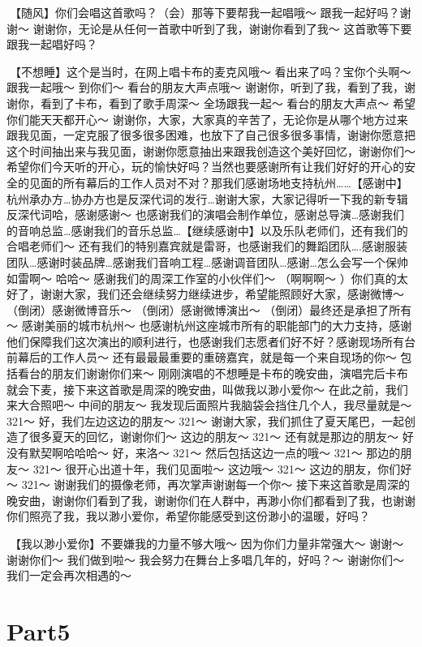 \documentclass[
]{book}
\begin{document}
🎵【随风】你们会唱这首歌吗？（会）那等下要帮我一起唱哦～ 跟我一起好吗？谢谢～ 谢谢你，无论是从任何一首歌中听到了我，谢谢你看到了我～ 这首歌等下要跟我一起唱好吗？

🎵【不想睡】这个是当时，在网上唱卡布的麦克风哦～ 看出来了吗？宝你个头啊～ 跟我一起哦～ 到你们～ 看台的朋友大声点哦～ 谢谢你，听到了我，看到了我，谢谢你，看到了卡布，看到了歌手周深～ 全场跟我一起～ 看台的朋友大声点～ 希望你们能天天都开心～ 谢谢你，大家，大家真的辛苦了，无论你是从哪个地方过来跟我见面，一定克服了很多很多困难，也放下了自己很多很多事情，谢谢你愿意把这个时间抽出来与我见面，谢谢你愿意抽出来跟我创造这个美好回忆，谢谢你们～ 希望你们今天听的开心，玩的愉快好吗？当然也要感谢所有让我们好好的开心的安全的见面的所有幕后的工作人员对不对？那我们感谢场地支持杭州\ldots\ldots【感谢中】杭州承办方\ldots 协办方也是反深代词的发行\ldots 谢谢大家，大家记得听一下我的新专辑反深代词哈，感谢感谢～ 也感谢我们的演唱会制作单位，感谢总导演\ldots 感谢我们的音响总监\ldots 感谢我们的音乐总监\ldots【继续感谢中】以及乐队老师们，还有我们的合唱老师们～ 还有我们的特别嘉宾就是雷哥，也感谢我们的舞蹈团队\ldots.感谢服装团队\ldots 感谢时装品牌\ldots 感谢我们音响工程\ldots 感谢调音团队\ldots 感谢\ldots 怎么会写一个保帅如雷啊～ 哈哈～ 感谢我们的周深工作室的小伙伴们～ （啊啊啊～ ）你们真的太好了，谢谢大家，我们还会继续努力继续进步，希望能照顾好大家，感谢微博～ （倒闭）感谢微博音乐～ （倒闭）感谢微博演出～ （倒闭）最终还是承担了所有～ 感谢美丽的城市杭州～ 也感谢杭州这座城市所有的职能部门的大力支持，感谢他们保障我们这次演出的顺利进行，也感谢我们志愿者们好不好？感谢现场所有台前幕后的工作人员～ 还有最最最重要的重磅嘉宾，就是每一个来自现场的你～ 包括看台的朋友们谢谢你们来～ 刚刚演唱的不想睡是卡布的晚安曲，演唱完后卡布就会下麦，接下来这首歌是周深的晚安曲，叫做我以渺小爱你～ 在此之前，我们来大合照吧～ 中间的朋友～ 我发现后面照片我脑袋会挡住几个人，我尽量就是～ 321～ 好，我们左边这边的朋友～ 321～ 谢谢大家，我们抓住了夏天尾巴，一起创造了很多夏天的回忆，谢谢你们～ 这边的朋友～ 321～ 还有就是那边的朋友～ 好没有默契啊哈哈哈～ 好，来洛～ 321～ 然后包括这边一点的哦～ 321～ 那边的朋友～ 321～ 很开心出道十年，我们见面啦～ 这边哦～ 321～ 这边的朋友，你们好～ 321～ 谢谢我们的摄像老师，再次掌声谢谢每一个你～ 接下来这首歌是周深的晚安曲，谢谢你们看到了我，谢谢你们在人群中，再渺小你们都看到了我，也谢谢你们照亮了我，我以渺小爱你，希望你能感受到这份渺小的温暖，好吗？

🎵【我以渺小爱你】不要嫌我的力量不够大哦～ 因为你们力量非常强大～ 谢谢～ 谢谢你们～ 我们做到啦～ 我会努力在舞台上多唱几年的，好吗？～ 谢谢你们～ 我们一定会再次相遇的～

\section{Part5}\label{hangzhou-20240823-part5}
\end{document}
